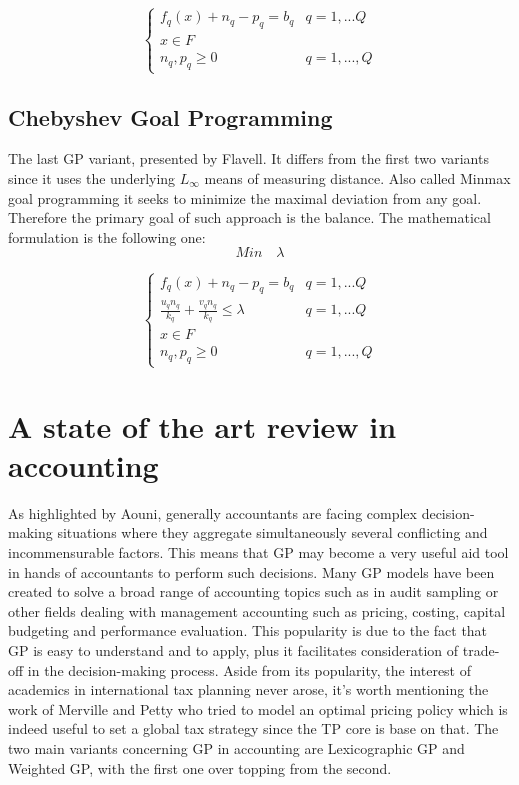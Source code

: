 \documentclass{article}
\begin{document}
\[
\begin{cases}
f_q(x)+n_q-p_q=b_q & q=1,...Q
\\
x\in F
\\
n_q,p_q\geq0 & q=1,...,Q
\end{cases}
\]

\subsection{Chebyshev Goal Programming}
The last GP variant, presented by Flavell. It differs from the first two variants since it uses the underlying $ L_\infty $ means of measuring distance. Also called Minmax goal programming it seeks to minimize the maximal deviation from any goal. Therefore the primary goal of such approach is the balance. The mathematical formulation is the following one:
\[
Min \quad \lambda
\]

\[
\begin{cases}
f_q(x)+n_q-p_q=b_q & q=1,...Q
\\
\frac{u_q n_q}{k_q}+\frac{v_q n_q}{k_q}\leq\lambda & q=1,...Q
\\
x\in F
\\
n_q,p_q\geq0 & q=1,...,Q
\end{cases}
\]

\section{A state of the art review in accounting}
As highlighted by Aouni\cite{aouni_goal_2017}, generally accountants are facing complex decision-making situations where they aggregate simultaneously several conflicting and incommensurable factors. This means that GP may become a very useful aid tool in hands of accountants to perform such decisions. Many GP models have been created to solve a broad range of accounting topics such as in audit sampling\cite{tayi_integration_1985} or other fields dealing with management accounting such as pricing\cite{tan_multipleobjective_2008}, costing\cite{dowlatshahi_product_2001}, capital budgeting and performance evaluation\cite{hung_integrated_2011}.
This popularity is due to the fact that GP is easy to understand and to apply, plus it facilitates consideration of trade-off in the decision-making process.
Aside from its popularity, the interest of academics in international tax planning never arose,
it’s worth mentioning the work of Merville and Petty\cite{merville_transfer_1978} who tried to model an optimal pricing policy which is indeed useful to set a global tax
strategy since the TP core is base on that.
The two main variants concerning GP in accounting are Lexicographic GP and Weighted GP, with the first one over topping from the second.
\end{document}
